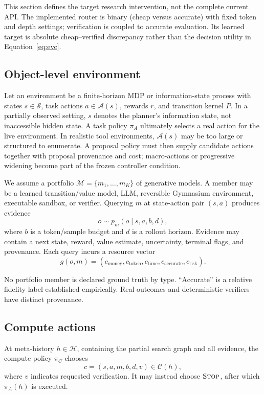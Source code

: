 \documentclass[10pt,twocolumn]{article}
\newcommand{\cA}{\mathcal{A}}
\newcommand{\cM}{\mathcal{M}}
\newcommand{\cC}{\mathcal{C}}
\newcommand{\cH}{\mathcal{H}}
\begin{document}
This section defines the target research intervention, not the complete current
API. The implemented router is binary (cheap versus accurate) with fixed token
and depth settings; verification is coupled to accurate evaluation. Its learned
target is absolute cheap--verified discrepancy rather than the decision utility
in Equation~\ref{eq:evc}.

\subsection{Object-level environment}

Let an environment be a finite-horizon MDP or information-state process with
states \(s \in \mathcal{S}\), task actions \(a \in \cA(s)\), rewards \(r\), and
transition kernel \(P\). In a partially observed setting, \(s\) denotes the
planner's information state, not inaccessible hidden state. A task policy
\(\pi_A\) ultimately selects a real action for the live environment.
In realistic tool environments, \(\cA(s)\) may be too large or structured to
enumerate. A proposal policy must then supply candidate actions together with
proposal provenance and cost; macro-actions or progressive widening become
part of the frozen controller condition.

We assume a portfolio \(\cM=\{m_1,\ldots,m_K\}\) of generative models. A member
may be a learned transition/value model, LLM, reversible Gymnasium environment,
executable sandbox, or verifier. Querying \(m\) at state-action pair \((s,a)\)
produces evidence
\[
o \sim p_m(o\mid s,a,b,d),
\]
where \(b\) is a token/sample budget and \(d\) is a rollout horizon. Evidence
may contain a next state, reward, value estimate, uncertainty, terminal flags,
and provenance. Each query incurs a resource vector
\[
g(o,m) =
(c_{\mathrm{money}},c_{\mathrm{token}},c_{\mathrm{time}},
 c_{\mathrm{accurate}},c_{\mathrm{risk}}).
\]

No portfolio member is declared ground truth by type. ``Accurate'' is a
relative fidelity label established empirically. Real outcomes and deterministic
verifiers have distinct provenance.

\subsection{Compute actions}

At meta-history \(h\in\cH\), containing the partial search graph and all
evidence, the compute policy \(\pi_C\) chooses
\[
c=(s,a,m,b,d,v)\in\cC(h),
\]
where \(v\) indicates requested verification. It may instead choose
\(\textsc{Stop}\), after which \(\pi_A(h)\) is executed.
\end{document}
